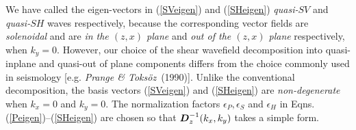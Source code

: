 \documentclass[11pt,a4paper]{article}
\newcommand{\bmi}[1]{\mbox{\boldmath$\mit #1$\unboldmath}}
\begin{document}
We have called the eigen-vectors in (\ref{SVeigen}) and (\ref{SHeigen})
{\em quasi-\/}$SV$ and {\em quasi-\/}$SH$ waves respectively, because the
corresponding vector fields are {\em solenoidal\/} and are {\em in the
$(z,x)$ plane\/}
and {\em out of the $(z,x)$ plane\/} respectively, when $k_{y}=0$. However, our
choice of the  shear wavefield decomposition into quasi-inplane and quasi-out
of plane components
differs from the choice commonly used in seismology [e.g.
{\em Prange \& Toks\"oz}~(1990)]. Unlike the conventional decomposition,  the basis vectors
(\ref{SVeigen}) and (\ref{SHeigen}) are {\em non-degenerate\/} when
${k}_{x}=0$ and ${k}_{y}=0$.
The normalization factors ${\epsilon}_{P},{\epsilon}_{S} $ and
${\epsilon}_{H}$
in Eqns.(\ref{Peigen})--(\ref{SHeigen}) are chosen so that ${\bmi
D}_{z}^{-1}({k}_{x},{k}_{y})$
takes a simple form.
\end{document}
